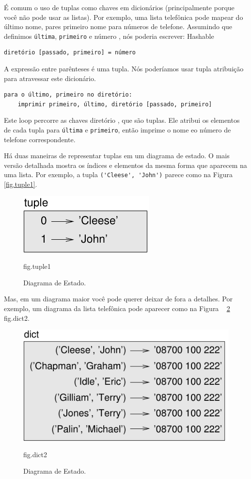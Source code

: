 \documentclass[10pt]{book}
\begin{document}
\begin{v erbatim}
{É comum o uso de tuplas como chaves em dicionários (principalmente porque
você não pode usar as listas). Por exemplo, uma lista telefônica pode mapear
do último nome, pares primeiro nome para números de telefone. Assumindo
que definimos {\tt última}, {\tt primeiro} e {número \tt}, nós
poderia escrever:
\index{} Hashable

\begin{verbatim}
diretório [passado, primeiro] = número
\end{verbatim}
%
A expressão entre parênteses é uma tupla. Nós poderíamos usar tupla
atribuição para atravessar este dicionário.

\begin{verbatim}
para o último, primeiro no diretório:
    imprimir primeiro, último, diretório [passado, primeiro]
\end{verbatim}
%
Este loop percorre as chaves {diretório \tt}, que são tuplas. Ele
atribui os elementos de cada tupla para {\tt última} e {\tt primeiro}, então
imprime o nome eo número de telefone correspondente.

Há duas maneiras de representar tuplas em um diagrama de estado. O mais
versão detalhada mostra os índices e elementos da mesma forma que aparecem na
uma lista. Por exemplo, a tupla \verb "('Cleese', 'John')" parece
como na Figura ~ \ref {fig.tuple1}.

\begin{figure}
\centerline
{\includegraphics[scale = 0.8] {figs/tuple1.pdf}}
\caption{Diagrama de Estado.}
\label{} fig.tuple1
\end{figure}

Mas, em um diagrama maior você pode querer deixar de fora a
detalhes. Por exemplo, um diagrama da lista telefônica pode
aparecer como na Figura ~ \ref {} fig.dict2.

\begin{figure}
\centerline
{\includegraphics[scale = 0.8] {figs/dict2.pdf}}
\caption{Diagrama de Estado.}
\label{} fig.dict2
\end{figure}

}
\end{v erbatim}
\end{document}
